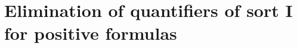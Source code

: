 \documentclass[10pt,oneside]{amsproc}
\newcommand{\mylabel}[1]{{#1}\hfill}
\renewenvironment{itemize}
  {\begin{list}{$\triangleright$}{%
  \setlength{\parskip}{0mm}
  \setlength{\topsep}{.4\baselineskip}
  \setlength{\rightmargin}{0mm}
  \setlength{\listparindent}{0mm}
  \setlength{\itemindent}{0mm}
  \setlength{\labelwidth}{3ex}
  \setlength{\itemsep}{.2\baselineskip}
  \setlength{\parsep}{.2\baselineskip}
  \setlength{\partopsep}{0mm}
  \setlength{\labelsep}{1ex}
  \setlength{\leftmargin}{\labelwidth+\labelsep}
  \let\makelabel\mylabel}}{%
\end{list}}
\begin{document}
{%
 






\section{Elimination of quantifiers of sort \textsf{I} for positive formulas}\label{Ielimination}

}
\end{document}
